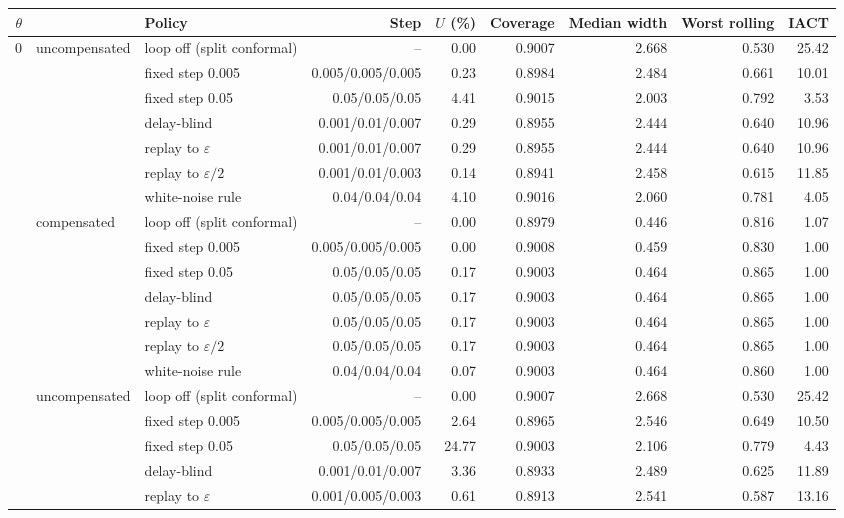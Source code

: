 \begin{tabular}{@{}rllrrrrrr@{}}
\toprule
$\theta$ & & Policy & Step & $U$ (\%) & Coverage & Median width & Worst rolling & IACT \\
\midrule
0 & uncompensated & loop off (split conformal) & -- & 0.00 & 0.9007 & 2.668 & 0.530 & 25.42 \\
 &  & fixed step 0.005 & 0.005/0.005/0.005 & 0.23 & 0.8984 & 2.484 & 0.661 & 10.01 \\
 &  & fixed step 0.05 & 0.05/0.05/0.05 & 4.41 & 0.9015 & 2.003 & 0.792 & 3.53 \\
 &  & delay-blind & 0.001/0.01/0.007 & 0.29 & 0.8955 & 2.444 & 0.640 & 10.96 \\
 &  & replay to $\varepsilon$ & 0.001/0.01/0.007 & 0.29 & 0.8955 & 2.444 & 0.640 & 10.96 \\
 &  & replay to $\varepsilon/2$ & 0.001/0.01/0.003 & 0.14 & 0.8941 & 2.458 & 0.615 & 11.85 \\
 &  & white-noise rule & 0.04/0.04/0.04 & 4.10 & 0.9016 & 2.060 & 0.781 & 4.05 \\
 & compensated & loop off (split conformal) & -- & 0.00 & 0.8979 & 0.446 & 0.816 & 1.07 \\
 &  & fixed step 0.005 & 0.005/0.005/0.005 & 0.00 & 0.9008 & 0.459 & 0.830 & 1.00 \\
 &  & fixed step 0.05 & 0.05/0.05/0.05 & 0.17 & 0.9003 & 0.464 & 0.865 & 1.00 \\
 &  & delay-blind & 0.05/0.05/0.05 & 0.17 & 0.9003 & 0.464 & 0.865 & 1.00 \\
 &  & replay to $\varepsilon$ & 0.05/0.05/0.05 & 0.17 & 0.9003 & 0.464 & 0.865 & 1.00 \\
 &  & replay to $\varepsilon/2$ & 0.05/0.05/0.05 & 0.17 & 0.9003 & 0.464 & 0.865 & 1.00 \\
 &  & white-noise rule & 0.04/0.04/0.04 & 0.07 & 0.9003 & 0.464 & 0.860 & 1.00 \\
\addlinespace
4 & uncompensated & loop off (split conformal) & -- & 0.00 & 0.9007 & 2.668 & 0.530 & 25.42 \\
 &  & fixed step 0.005 & 0.005/0.005/0.005 & 2.64 & 0.8965 & 2.546 & 0.649 & 10.50 \\
 &  & fixed step 0.05 & 0.05/0.05/0.05 & 24.77 & 0.9003 & 2.106 & 0.779 & 4.43 \\
 &  & delay-blind & 0.001/0.01/0.007 & 3.36 & 0.8933 & 2.489 & 0.625 & 11.89 \\
 &  & replay to $\varepsilon$ & 0.001/0.005/0.003 & 0.61 & 0.8913 & 2.541 & 0.587 & 13.16 \\

\end{tabular}
